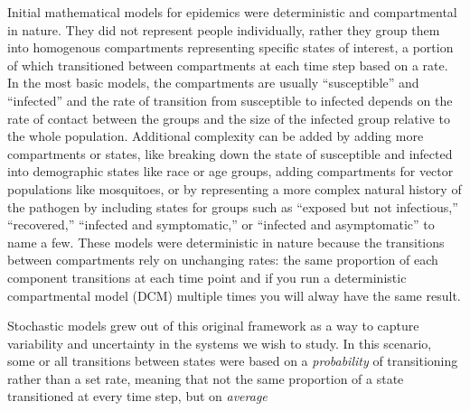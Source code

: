 \documentclass [11pt, proquest] {uwthesis}[2015/03/03]
\begin{document}
Initial mathematical models for epidemics were deterministic and compartmental in nature. They did not represent people individually, rather they group them into homogenous compartments representing specific states of interest, a portion of which transitioned between compartments at each time step based on a rate. In the most basic models, the compartments are usually ``susceptible'' and ``infected'' and the rate of transition from susceptible to infected depends on the rate of contact between the groups and the size of the infected group relative to the whole population. Additional complexity can be added by adding more compartments or states, like breaking down the state of susceptible and infected into demographic states like race or age groups, adding compartments for vector populations like mosquitoes, or by representing a more complex natural history of the pathogen by including states for groups such as ``exposed but not infectious,'' ``recovered,'' ``infected and symptomatic,'' or ``infected and asymptomatic'' to name a few. These models were deterministic in nature because the transitions between compartments rely on unchanging rates: the same proportion of each component transitions at each time point and if you run a deterministic compartmental model (DCM) multiple times you will alway have the same result.

Stochastic models grew out of this original framework as a way to capture variability and uncertainty in the systems we wish to study. In this scenario, some or all transitions between states were based on a \emph{probability} of transitioning rather than a set rate, meaning that not the same proportion of a state transitioned at every time step, but on \emph{average}
\end{document}
